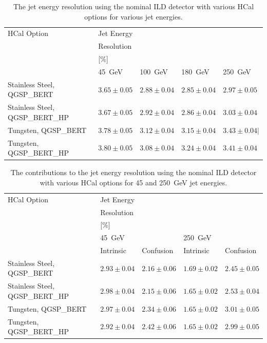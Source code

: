 \begin{table}[h!]
\centering
\begin{tabular}{ l l l l l }
\hline
HCal Option & Jet Energy & & & \\
 & Resolution & & & \\
 & [\%] & & & \\
 & 45~GeV & 100~GeV & 180~GeV & 250~GeV \\
\hline
Stainless Steel, QGSP\_BERT & $3.65 \pm 0.05$ &$2.88 \pm 0.04$ &$2.85 \pm 0.04$ &$2.97 \pm 0.05$ \\
Stainless Steel, QGSP\_BERT\_HP & $3.67 \pm 0.05$ &$2.92 \pm 0.04$ &$2.86 \pm 0.04$ &$3.03 \pm 0.04$ \\
Tungsten, QGSP\_BERT & $3.78 \pm 0.05$ & $3.12 \pm 0.04$ & $3.15 \pm 0.04$ & $3.43 \pm 0.04 |$ \\
Tungsten, QGSP\_BERT\_HP & $3.80 \pm 0.05$ & $3.08 \pm 0.04$ & $3.24 \pm 0.04$ & $3.41 \pm 0.04$ \\
\hline
\end{tabular}
\caption[The jet energy resolution using the nominal ILD detector with various HCal options for various jet energies.]{The jet energy resolution using the nominal ILD detector with various HCal options for various jet energies.}
\label{table:jerhcalabsmaterial}
\end{table}

\begin{table}[h!]
\centering
\begin{tabular}{ l l l l l }
\hline
HCal Option & Jet Energy & & & \\
 & Resolution & & & \\
 & [\%] & & & \\
 & 45~GeV & & 250~GeV & \\
 & Intrinsic & Confusion & Intrinsic & Confusion \\
\hline
Stainless Steel, QGSP\_BERT & $2.93 \pm 0.04$ & $2.16 \pm 0.06$ & $1.69 \pm 0.02$ &$2.45 \pm 0.05$ \\
Stainless Steel, QGSP\_BERT\_HP & $2.98 \pm 0.04$ &$2.15 \pm 0.06$ &$1.65 \pm 0.02$ &$2.53 \pm 0.04$ \\
Tungsten, QGSP\_BERT & $2.97 \pm 0.04$ & $2.34 \pm 0.06$ & $1.65 \pm 0.02$ & $3.01 \pm 0.05$ \\
Tungsten, QGSP\_BERT\_HP & $2.92 \pm 0.04$ & $2.42 \pm 0.06$ & $1.65 \pm 0.02$ & $2.99 \pm 0.05$ \\
\hline
\end{tabular}
\caption[The contributions to the jet energy resolution using the nominal ILD detector with various HCal options for 45 and 250~GeV jet energies.]{The contributions to the jet energy resolution using the nominal ILD detector with various HCal options for 45 and 250~GeV jet energies.}
\label{table:jerbdhcalabsmaterial}
\end{table}

